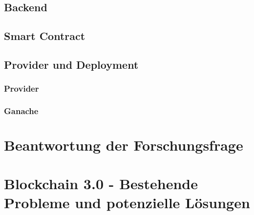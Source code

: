 \subsection{Backend}
\subsection{Smart Contract}
\subsection{Provider und Deployment}
\subsubsection{Provider}
\subsubsection{Ganache}
\section{Beantwortung der Forschungsfrage}
\section{Blockchain 3.0 - Bestehende Probleme und potenzielle Lösungen}
